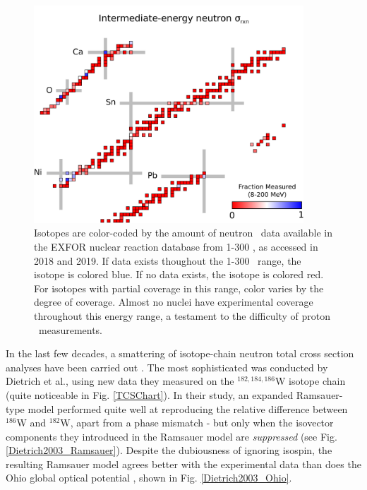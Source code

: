 \begin{figure}
    \centering
    \includegraphics[width=0.9\textwidth]{figures/RCSChart.png}
    \caption[Landscape of existing proton \rxn\ data in 2019]
    {Isotopes are color-coded by the amount of neutron \tot\ data available in the EXFOR nuclear
        reaction database from 1-300 \mega\electronvolt, as accessed in 2018 and 2019. If data exists thoughout the 1-300 \mega\electronvolt\ range, the isotope
        is colored blue. If no data exists, the isotope is colored red. For
        isotopes with partial coverage in this range, color varies by the degree
        of coverage. Almost no nuclei have experimental coverage throughout this energy
        range, a testament to the difficulty of proton \rxn\ measurements.}
    \label{RCSChart}
\end{figure}

In the last few decades, a smattering of isotope-chain neutron total cross section
analyses have been carried out \cite{Mukhopadhyay2011, Anderson1990, Camarda1984}. The most sophisticated
was conducted by Dietrich et al.\cite{Dietrich2003},
using new data they measured on the $^{182,184,186}$W isotope chain (quite noticeable in Fig.
\ref{TCSChart}). In their study, an expanded Ramsauer-type model performed quite well at reproducing the relative 
difference between $^{186}$W and $^{182}$W, apart from a
phase mismatch - but only when the isovector components they introduced in the
Ramsauer model are \textit{suppressed} (see Fig. \ref{Dietrich2003_Ramsauer}). Despite the
dubiousness of ignoring isospin, the resulting Ramsauer model
agrees better with the experimental data than does the Ohio global optical 
potential \cite{Rapaport1979}, shown in Fig. \ref{Dietrich2003_Ohio}.

